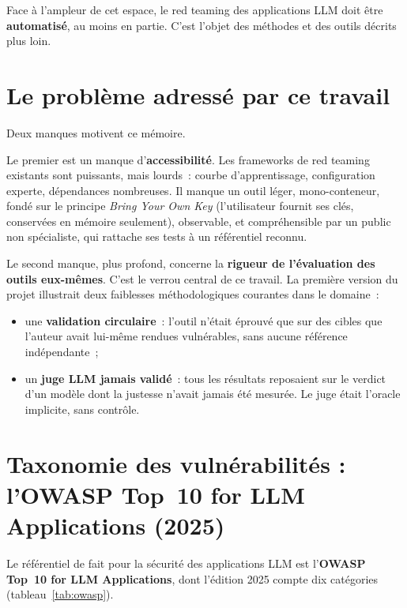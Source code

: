 Face à l'ampleur de cet espace, le red teaming des applications LLM doit être \textbf{automatisé}, au moins en partie. C'est l'objet des méthodes et des outils décrits plus loin.

\section{Le problème adressé par ce travail}

Deux manques motivent ce mémoire.

Le premier est un manque d'\textbf{accessibilité}. Les frameworks de red teaming existants sont puissants, mais lourds~: courbe d'apprentissage, configuration experte, dépendances nombreuses. Il manque un outil léger, mono-conteneur, fondé sur le principe \emph{Bring Your Own Key} (l'utilisateur fournit ses clés, conservées en mémoire seulement), observable, et compréhensible par un public non spécialiste, qui rattache ses tests à un référentiel reconnu.

Le second manque, plus profond, concerne la \textbf{rigueur de l'évaluation des outils eux-mêmes}. C'est le verrou central de ce travail. La première version du projet illustrait deux faiblesses méthodologiques courantes dans le domaine~:
\begin{itemize}
  \item une \textbf{validation circulaire}~: l'outil n'était éprouvé que sur des cibles que l'auteur avait lui-même rendues vulnérables, sans aucune référence indépendante~;
  \item un \textbf{juge LLM jamais validé}~: tous les résultats reposaient sur le verdict d'un modèle dont la justesse n'avait jamais été mesurée. Le juge était l'oracle implicite, sans contrôle.
\end{itemize}

\section{Taxonomie des vulnérabilités : l'OWASP Top~10 for LLM Applications (2025)}

Le référentiel de fait pour la sécurité des applications LLM est l'\textbf{OWASP Top~10 for LLM Applications}, dont l'édition 2025 compte dix catégories (tableau~\ref{tab:owasp}).

